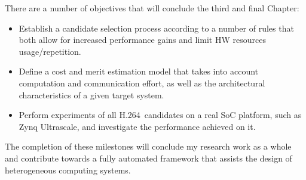 \documentclass[]{usiinfthesis}
\newcommand{\htsf}{{H.264}}
\newcommand{\candidates}{{AccelCand}s}
\begin{document}
There are a number of objectives that will conclude the third and final Chapter:

\begin{itemize}
\item{} Establish a candidate selection process according to a number of rules that 
both allow for increased performance gains and limit HW resources usage/repetition.
\item{} Define a cost and merit estimation model that takes into account computation and
communication effort, as well as the architectural characteristics of a given target system. 
\item{} Perform experiments of all \htsf\ candidates on a real SoC platform, such as Zynq Ultrascale, 
and investigate the performance achieved on it.
\end{itemize}
The completion of these milestones will conclude my research work as a whole and contribute towards a fully automated
framework that assists the design of heterogeneous computing systems.


\backmatter


%

%
%


%
%
%
\end{document}
